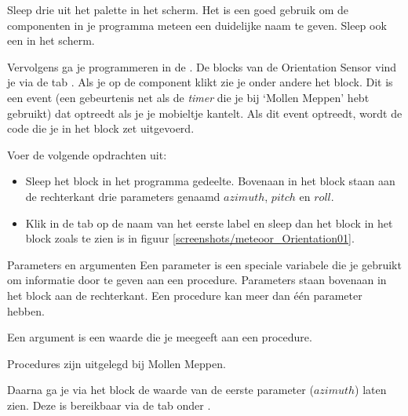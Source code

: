 \begin{opgave}
    \opgVraag
  Sleep drie  uit het  palette in het scherm. Het is een goed gebruik om de componenten in je programma meteen een duidelijke naam te geven. Sleep ook een  in het scherm.
\end{opgave}

Vervolgens ga je programmeren in de . De blocks van de Orientation Sensor vind je via de tab . Als je op de  component klikt zie je onder andere het  block. Dit is een event (een gebeurtenis net als de \emph{timer} die je bij `Mollen Meppen' hebt gebruikt) dat optreedt als je je mobieltje kantelt. Als dit event optreedt, wordt de code die je in het  block zet uitgevoerd. 

\begin{opgave}
    \opgVraag
  Voer de volgende opdrachten uit:
  \begin{itemize}
    \item Sleep het  block in het programma gedeelte. Bovenaan in het block staan aan de rechterkant drie parameters genaamd $azimuth$, $pitch$ en $roll$.
    \item Klik in de tab  op de naam van het eerste label en sleep dan het  block in het  block zoals te zien is in figuur \ref{screenshots/meteoor_Orientation01}.
  \end{itemize}
\end{opgave}


\pagebreak
\begin{derivation}{Parameters en argumenten}
Een parameter is een speciale variabele die je gebruikt om informatie door te geven aan een procedure. Parameters staan bovenaan in het block aan de rechterkant. Een procedure kan meer dan \'e\'en parameter hebben.

Een argument is een waarde die je meegeeft aan een procedure.

Procedures zijn uitgelegd bij Mollen Meppen.
\end{derivation}

Daarna ga je via het  block de waarde van de eerste parameter ($azimuth$) laten zien. Deze is bereikbaar via de  tab onder .

